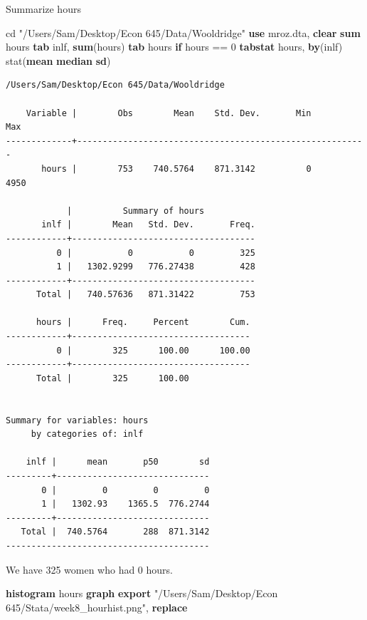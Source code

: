 \documentclass[
]{book}
\newenvironment{Shaded}{\begin{snugshade}}{\end{snugshade}}
\newcommand{\FunctionTok}[1]{\textcolor[rgb]{0.13,0.29,0.53}{\textbf{#1}}}
\newcommand{\KeywordTok}[1]{\textcolor[rgb]{0.13,0.29,0.53}{\textbf{#1}}}
\newcommand{\NormalTok}[1]{#1}
\newcommand{\StringTok}[1]{\textcolor[rgb]{0.31,0.60,0.02}{#1}}
\begin{document}
Summarize hours

\begin{Shaded}
\begin{Highlighting}[]
\NormalTok{cd }\StringTok{"/Users/Sam/Desktop/Econ 645/Data/Wooldridge"}
\KeywordTok{use}\NormalTok{ mroz.dta, }\KeywordTok{clear}
\KeywordTok{sum}\NormalTok{ hours}
\KeywordTok{tab}\NormalTok{ inlf, }\KeywordTok{sum}\NormalTok{(hours)}
\KeywordTok{tab}\NormalTok{ hours }\KeywordTok{if}\NormalTok{ hours == 0}
\KeywordTok{tabstat}\NormalTok{ hours, }\KeywordTok{by}\NormalTok{(inlf) stat(}\KeywordTok{mean} \KeywordTok{median} \FunctionTok{sd}\NormalTok{)}
\end{Highlighting}
\end{Shaded}

\begin{verbatim}
/Users/Sam/Desktop/Econ 645/Data/Wooldridge

    Variable |        Obs        Mean    Std. Dev.       Min        Max
-------------+---------------------------------------------------------
       hours |        753    740.5764    871.3142          0       4950

            |          Summary of hours
       inlf |        Mean   Std. Dev.       Freq.
------------+------------------------------------
          0 |           0           0         325
          1 |   1302.9299   776.27438         428
------------+------------------------------------
      Total |   740.57636   871.31422         753

      hours |      Freq.     Percent        Cum.
------------+-----------------------------------
          0 |        325      100.00      100.00
------------+-----------------------------------
      Total |        325      100.00


Summary for variables: hours
     by categories of: inlf 

    inlf |      mean       p50        sd
---------+------------------------------
       0 |         0         0         0
       1 |   1302.93    1365.5  776.2744
---------+------------------------------
   Total |  740.5764       288  871.3142
----------------------------------------
\end{verbatim}

We have 325 women who had 0 hours.

\begin{Shaded}
\begin{Highlighting}[]
\KeywordTok{histogram}\NormalTok{ hours}
\KeywordTok{graph} \KeywordTok{export} \StringTok{"/Users/Sam/Desktop/Econ 645/Stata/week8\_hourhist.png"}\NormalTok{, }\KeywordTok{replace}
\end{Highlighting}
\end{Shaded}
\end{document}
